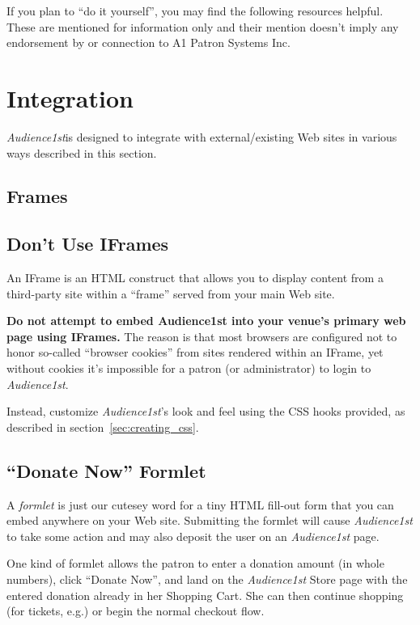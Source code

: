 \documentclass{article}
\newcommand{\af}{{\em Audience1st}}
\begin{document}
If you plan to ``do it yourself'', you may find the following resources
helpful.  These are mentioned for information only and their mention
doesn't imply any endorsement by or connection to A1 Patron Systems Inc.

\section{Integration}
\label{sec:external-integration}

\af is designed to integrate with external/existing Web sites in various
ways described in this section.

\subsection{Frames}



\subsection{Don't Use IFrames}
\label{sec:iframes}

An IFrame is an HTML construct that allows you to display content from a
third-party site within a ``frame'' served from your main Web site.

\textbf{Do not attempt to embed Audience1st into your venue's primary
  web page using IFrames.}  The reason is that most browsers are
configured not to honor so-called ``browser cookies'' from sites
rendered within an IFrame, yet without cookies it's impossible for a
patron (or administrator) to login to \af.

Instead, customize \af's look and feel using the CSS hooks provided, as
described in section~\ref{sec:creating_css}.

\subsection{``Donate Now'' Formlet}

A \emph{formlet} is just our cutesey word for a tiny HTML fill-out form
that you can embed anywhere on your Web site.  Submitting the formlet
will cause \af{} to take some action and may also deposit the user on an
\af{} page.

One kind of formlet allows the patron to enter a donation amount (in
whole numbers), click ``Donate Now'', and land on the \af{} Store page
with the entered donation already in her Shopping Cart.  She can then
continue shopping (for tickets, e.g.) or begin the normal checkout flow.
\end{document}
